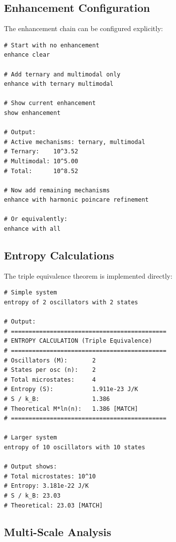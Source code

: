 \documentclass[twocolumn,10pt]{article}
\begin{document}
\subsection{Enhancement Configuration}

The enhancement chain can be configured explicitly:

\begin{lstlisting}[caption={Enhancement configuration}]
# Start with no enhancement
enhance clear

# Add ternary and multimodal only
enhance with ternary multimodal

# Show current enhancement
show enhancement

# Output:
# Active mechanisms: ternary, multimodal
# Ternary:    10^3.52
# Multimodal: 10^5.00
# Total:      10^8.52

# Now add remaining mechanisms
enhance with harmonic poincare refinement

# Or equivalently:
enhance with all
\end{lstlisting}

\subsection{Entropy Calculations}

The triple equivalence theorem is implemented directly:

\begin{lstlisting}[caption={Entropy calculation examples}]
# Simple system
entropy of 2 oscillators with 2 states

# Output:
# ============================================
# ENTROPY CALCULATION (Triple Equivalence)
# ============================================
# Oscillators (M):       2
# States per osc (n):    2
# Total microstates:     4
# Entropy (S):           1.911e-23 J/K
# S / k_B:               1.386
# Theoretical M*ln(n):   1.386 [MATCH]
# ============================================

# Larger system
entropy of 10 oscillators with 10 states

# Output shows:
# Total microstates: 10^10
# Entropy: 3.181e-22 J/K
# S / k_B: 23.03
# Theoretical: 23.03 [MATCH]
\end{lstlisting}

\subsection{Multi-Scale Analysis}
\end{document}

